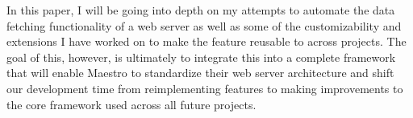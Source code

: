 In this paper, I will be going into depth on my attempts to automate the data fetching functionality of a web server as well as some of the customizability and extensions I have worked on to make the feature reusable to across projects.  The goal of this, however, is ultimately to integrate this into a complete framework that will enable Maestro to standardize their web server architecture and shift our development time from reimplementing features to making improvements to the core framework used across all future projects. 